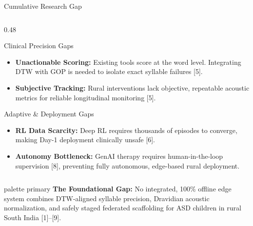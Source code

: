 \documentclass[aspectratio=169, 11pt, xcolor=table]{beamer}
\begin{document}
\begin{frame}{Cumulative Research Gap}
\begin{columns}[T, totalwidth=\textwidth]
        \begin{column}{0.48\textwidth}
            \begin{block}{Clinical Precision Gaps}
                \tiny
                \begin{itemize}
                    \setlength{\itemsep}{2pt}
                    \item \textbf{Unactionable Scoring:} Existing tools score at the word level. Integrating DTW with GOP is needed to isolate exact syllable failures [5].
                    \item \textbf{Subjective Tracking:} Rural interventions lack objective, repeatable acoustic metrics for reliable longitudinal monitoring [5].
                \end{itemize}
            \end{block}

            \vspace{1mm}

            \begin{block}{Adaptive \& Deployment Gaps}
                \tiny
                \begin{itemize}
                    \setlength{\itemsep}{2pt}
                    \item \textbf{RL Data Scarcity:} Deep RL requires thousands of episodes to converge, making Day-1 deployment clinically unsafe [6].
                    \item \textbf{Autonomy Bottleneck:} GenAI therapy requires human-in-the-loop supervision [8], preventing fully autonomous, edge-based rural deployment.
                \end{itemize}
            \end{block}
        \end{column}
    \end{columns}

    \vspace{2mm}
    \begin{beamercolorbox}[sep=3pt, center, rounded=true]{palette primary}
        \tiny \textbf{The Foundational Gap:} No integrated, 100\% offline edge system combines DTW-aligned syllable precision, Dravidian acoustic normalization, and safely staged federated scaffolding for ASD children in rural South India [1]--[9].
    \end{beamercolorbox}
\end{frame}
\end{document}
